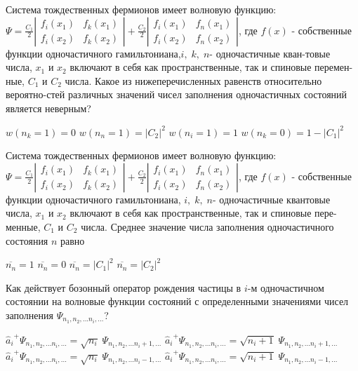 \documentclass[11pt,a4paper]{exam}
\begin{document}
\begin{questions}
\question Система тождественных фермионов имеет волновую функцию:
$\Psi  = \frac{{{C_1}}}{2}\left| {\begin{array}{*{20}{c}}
{{f_i}({x_1})}&{{f_k}({x_1})}\\
{{f_i}({x_2})}&{{f_k}({x_2})}
\end{array}} \right| + \frac{{{C_2}}}{2}\left| {\begin{array}{*{20}{c}}
{{f_i}({x_1})}&{{f_n}({x_1})}\\
{{f_i}({x_2})}&{{f_n}({x_2})}
\end{array}} \right|$, 
где $f(x)$ - собственные функции одночастичного гамильтониана,$i,\;k,\;n$- одночастичные кван-товые числа, ${x_1}$ и ${x_2}$ включают в себя как пространственные, так и спиновые перемен-ные, ${C_1}$ и ${C_2}$ числа. Какое из нижеперечисленных равенств относительно вероятно-стей различных значений чисел заполнения одночастичных состояний является неверным?
\begin{choices}
\choice $w({n_k} = 1) = 0$   
\choice $w({n_n} = 1) = {\left| {{C_2}} \right|^2}$  
\choice $w({n_i} = 1) = 1$   
\choice $w({n_k} = 0) = 1 - |{C_1}{|^2}$
\end{choices}

\question Система тождественных фермионов имеет волновую функцию:
$\Psi  = \frac{{{C_1}}}{2}\left| {\begin{array}{*{20}{c}}
{{f_i}({x_1})}&{{f_k}({x_1})}\\
{{f_i}({x_2})}&{{f_k}({x_2})}
\end{array}} \right| + \frac{{{C_2}}}{2}\left| {\begin{array}{*{20}{c}}
{{f_i}({x_1})}&{{f_n}({x_1})}\\
{{f_i}({x_2})}&{{f_n}({x_2})}
\end{array}} \right|$, 
где $f(x)$ - собственные функции одночастичного гамильтониана, $i,\;k,\;n$- одночастичные квантовые числа, ${x_1}$ и ${x_2}$ включают в себя как пространственные, так и спиновые пере-менные, ${C_1}$ и ${C_2}$ числа. Среднее значение числа заполнения одночастичного состояния $n$ равно
\begin{choices}
\choice $\overline {{n_n}}  = 1$   
\choice $\overline {{n_n}}  = 0$   
\choice $\overline {{n_n}}  = {\left| {{C_1}} \right|^2}$     
\choice $\overline {{n_n}}  = {\left| {{C_2}} \right|^2}$
\end{choices}

\question Как действует бозонный оператор рождения частицы в $i$-м одночастичном состоянии на волновые функции состояний с определенными значениями чисел заполнения ${\Psi _{{n_1},{n_2},...{n_i},...}}$?
\begin{choices}
\choice ${\hat a_i}^ + {\Psi _{{n_1},{n_2},...{n_i},...}} = \sqrt {{n_i}} \;{\Psi _{{n_1},{n_2},...{n_i} + 1,...}}$    
\choice ${\hat a_i}^ + {\Psi _{{n_1},{n_2},...{n_i},...}} = \sqrt {{n_i} + 1} \;{\Psi _{{n_1},{n_2},...{n_i} + 1,...}}$
\choice ${\hat a_i}^ + {\Psi _{{n_1},{n_2},...{n_i},...}} = \sqrt {{n_i}} \;{\Psi _{{n_1},{n_2},...{n_i} - 1,...}}$    
\choice ${\hat a_i}^ + {\Psi _{{n_1},{n_2},...{n_i},...}} = \sqrt {{n_i} + 1} \;{\Psi _{{n_1},{n_2},...{n_i} - 1,...}}$
\end{choices}


\end{questions}
\end{document}
